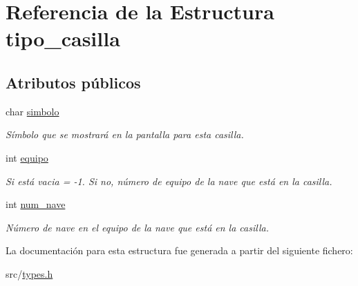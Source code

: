 \hypertarget{structtipo__casilla}{}\section{Referencia de la Estructura tipo\+\_\+casilla}
\label{structtipo__casilla}
\subsection*{Atributos públicos}
\begin{DoxyCompactItemize}
\item 
\mbox{\label{structtipo__casilla_a028b6f19741cf3492c595a2868175fd5}} 
char \hyperlink{structtipo__casilla_a028b6f19741cf3492c595a2868175fd5}{simbolo}
\begin{DoxyCompactList}\small\item\em Símbolo que se mostrará en la pantalla para esta casilla. \end{DoxyCompactList}\item 
\mbox{\label{structtipo__casilla_aa0d456b8dc9a45dc12fd1018f971823f}} 
int \hyperlink{structtipo__casilla_aa0d456b8dc9a45dc12fd1018f971823f}{equipo}
\begin{DoxyCompactList}\small\item\em Si está vacia = -\/1. Si no, número de equipo de la nave que está en la casilla. \end{DoxyCompactList}\item 
\mbox{\label{structtipo__casilla_ae77bfa35dab21aa7ec15a7476f7e317a}} 
int \hyperlink{structtipo__casilla_ae77bfa35dab21aa7ec15a7476f7e317a}{num\+\_\+nave}
\begin{DoxyCompactList}\small\item\em Número de nave en el equipo de la nave que está en la casilla. \end{DoxyCompactList}\end{DoxyCompactItemize}


La documentación para esta estructura fue generada a partir del siguiente fichero\+:\begin{DoxyCompactItemize}
\item 
src/\hyperlink{types_8h}{types.\+h}\end{DoxyCompactItemize}
